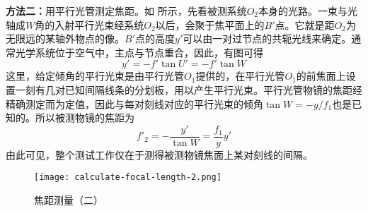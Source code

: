 \textbf{方法二：}用平行光管测定焦距。如 所示，先看被测系统$O_2$本身的光路。一束与光轴成$W$角的入射平行光束经系统$O_2$以后，会聚于焦平面上的$B'$点。它就是距$O_2$为无限远的某轴外物点的像。$B'$点的高度$y'$可以由一对过节点的共轭光线来确定。通常光学系统位于空气中，主点与节点重合，因此，有图可得
\begin{equation}
y'=-f'\tan U'=-f'\tan W
\end{equation}
这里，给定倾角的平行光束是由平行光管$O_1$提供的，在平行光管$O_1$的前焦面上设置一刻有几对已知间隔线条的分划板，用以产生平行光束。平行光管物镜的焦距经精确测定而为定值，因此与每对刻线对应的平行光束的倾角$\tan W=-y/f_1$也是已知的。所以被测物镜的焦距为
\begin{equation}
f'_2=-\frac{y'}{\tan W}=\frac{f_1}{y}y'
\end{equation}
由此可见，整个测试工作仅在于测得被测物镜焦面上某对刻线的间隔。

\begin{figure}[htbp]
	\centering
	\texttt{[image: calculate-focal-length-2.png]}
	\caption{焦距测量（二）}
	\label{fig:calculate-focal-length-2}
\end{figure}